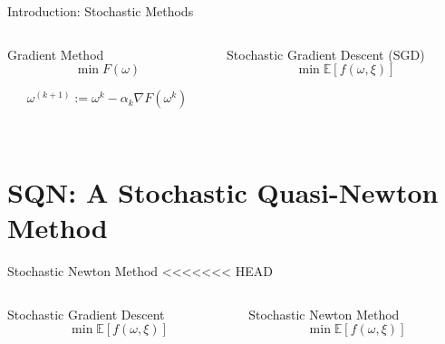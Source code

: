 \documentclass[10pt]{beamer}
\begin{document}
  \begin{frame}{Introduction: Stochastic Methods}
    \begin{columns}[T]
      \begin{column}{.5\textwidth}
        \centering \alert{Gradient Method}
        $$\min F(\omega) $$
        \phantom{0}
        
        $$\omega^{(k+1)}:= \omega^{k}-\alpha_k \nabla F(\omega^{k})$$\\
        \phantom{zeile}
        
      \end{column}\hfill
      \begin{column}{.5\textwidth}
        \centering \alert{Stochastic Gradient Descent (SGD)}
        $$\min \mathbb E \left [f(\omega, \xi)\right]$$
      \end{column}
    \end{columns}
  \end{frame}

\section{SQN: A Stochastic Quasi-Newton Method}

 
  \begin{frame}{Stochastic Newton Method}
<<<<<<< HEAD

    \begin{columns}[T]
      \begin{column}{.5\textwidth}
        \centering \alert{Stochastic Gradient Descent}
        $$\min \mathbb E \left [f(\omega, \xi)\right]$$
      \end{column}\hfill
      \begin{column}{.5\textwidth}
        \centering \alert{Stochastic Newton Method}
        $$\min \mathbb E \left [f(\omega, \xi)\right]$$
      \end{column}
    \end{columns}
  \end{frame}
  
\end{document}
